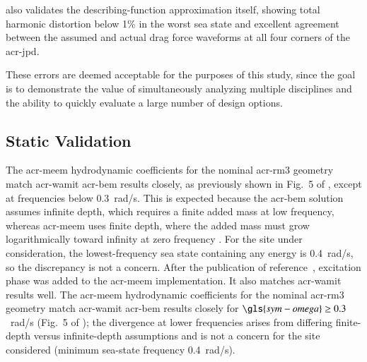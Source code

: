  also validates the describing-function approximation itself,
showing total harmonic distortion below 1\% in the worst sea state
and excellent agreement between the assumed and actual drag force waveforms at all four corners of the \gls{acr-jpd}.

These errors are deemed acceptable for the purposes of this study,
since the goal is to demonstrate the value of simultaneously analyzing multiple disciplines
and the ability to quickly evaluate a large number of design options.
\subsection{Static Validation}

\ifdefined\DISSERTATION
    The \gls{acr-meem} hydrodynamic coefficients for the nominal \gls{acr-rm3} geometry match \gls{acr-wamit} \gls{acr-bem} results closely, as previously shown in Fig.~5 of \citep{mccabe_open-source_2024}, except at frequencies below 0.3~rad/s.
    This is expected because the \gls{acr-bem} solution assumes infinite depth, which requires a finite added mass at low frequency, whereas \gls{acr-meem} uses finite depth, where the added mass must grow logarithmically toward infinity at zero frequency \citep{mciver_added_1991}.
    For the site under consideration, the lowest-frequency sea state containing any energy is 0.4~rad/s, so the discrepancy is not a concern.
    After the publication of reference~\citet{mccabe_open-source_2024}, excitation phase was added to the \gls{acr-meem} implementation.
It also matches \gls{acr-wamit} results well.
\else
    The \gls{acr-meem} hydrodynamic coefficients for the nominal \gls{acr-rm3} geometry match \gls{acr-wamit} \gls{acr-bem} results closely for $\gls{sym-omega} \geq 0.3$~rad/s (Fig.~5 of \citet{mccabe_open-source_2024});
    the divergence at lower frequencies arises from differing finite-depth versus infinite-depth assumptions \citep{mciver_added_1991} and is not a concern for the site considered (minimum sea-state frequency 0.4~rad/s).
\fi

